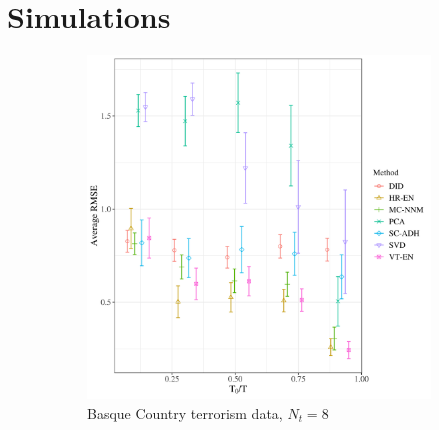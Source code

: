 \documentclass[12pt]{article}
\begin{document}
\begin{singlespacing}
\maketitle \thispagestyle{empty}
\tableofcontents \thispagestyle{empty}
\end{singlespacing}


\pagebreak
{}%

\section{Simulations} \label{sims-sm}

\begin{figure}[htbp]
	\centering
	\begin{subfigure}[t]{0.45\textwidth}
		\centering
		\includegraphics[width=\textwidth]{plots/basque_N_16_T_43_numruns_20_num_treated_8_simultaneuous_1.png}
		\caption{Basque Country terrorism data, $N_t = 8$} 
	\end{subfigure}
	~ 
	\begin{subfigure}[t]{0.45\textwidth}
		\centering

\end{subfigure}
\end{figure}
\end{document}
